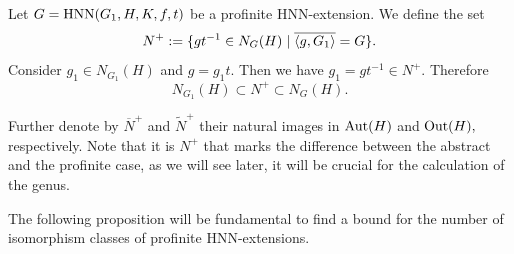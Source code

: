 \documentclass[a4paper,12pt]{article}
\newtheorem{cor}[thm]{Corollary}
\newtheorem{prop}[thm]{Proposition}
\def\aut {{\rm Aut}}
\def\out {{\rm Out}}
\def\hnn {{\rm HNN}}
\begin{document}
{%
Let $G= \hnn(G_1, H, K, f, t)$ be a profinite HNN-extension. We define the set \begin{equation} \label{N mais}  N^{+}:=\{ gt^{- 1} \in N_{G}(H) \hspace{0.1cm} | \hspace{0.1cm}  \overline{\left\langle g, G_1 \right\rangle}=G\}.\end{equation} 
Consider $g_1\in N_{G_1}(H)$ and $g=g_1t$. Then we have $g_1=gt^{-1}\in N^{+}.$ Therefore \begin{equation} \label{NG1H em N+} N_{G_1}(H) \subset N^{+} \subset N_{G}(H) .\end{equation}


 Further denote by $\overline{N}^{+}$ and $\widetilde{N}^{+}$  their natural images in $\aut(H)$ and $\out(H),$ 
respectively. Note that it is $N^+$ that marks the difference between the abstract and the profinite case, as we will see later, it will be crucial for the calculation of the genus.  

The following proposition will be fundamental to find a bound for the number of isomorphism classes of profinite HNN-extensions. %
 






}
\end{document}
